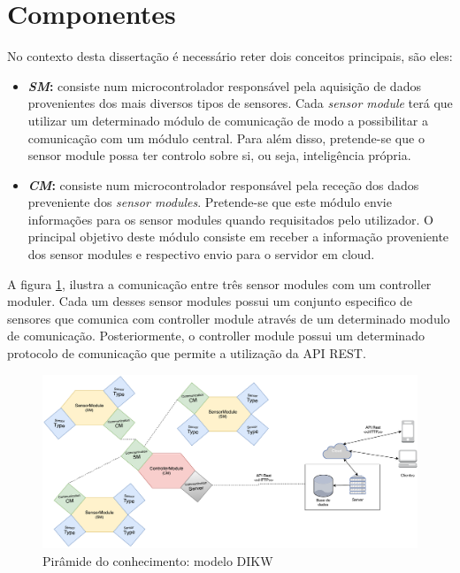 \newpage
\section{Componentes}

No contexto desta dissertação é necessário reter dois conceitos principais, são eles: 

\begin{itemize}
	\item \textbf{\textit{\acl{SM}}:} consiste num microcontrolador responsável pela aquisição de dados provenientes dos mais diversos tipos de sensores. Cada \textit{sensor module} terá que utilizar um determinado módulo de comunicação de modo a possibilitar a comunicação com um módulo central. Para além disso, pretende-se que o sensor module possa ter controlo sobre si, ou seja, inteligência própria.
	 
	\item \textbf{\textit{\acl{CM}}:} consiste num microcontrolador responsável pela receção dos dados preveniente dos \textit{sensor modules}. Pretende-se que este módulo envie informações para os sensor modules quando requisitados pelo utilizador. O principal objetivo deste módulo consiste em receber a informação proveniente dos sensor modules e respectivo envio para o servidor em cloud. 
	
	
\end{itemize}


A figura \ref{esquema1}, ilustra a comunicação entre três sensor modules com um controller moduler. Cada um desses sensor modules possui um conjunto especifico de sensores que comunica com controller module através de um determinado modulo de comunicação. Posteriormente, o controller module possui um determinado protocolo de comunicação que permite a utilização da API REST. 


\begin{figure}[h]
	\centering
	\includegraphics[width=\linewidth]{esquemas/general-electronic-modules.pdf}
	\caption{Pirâmide do conhecimento: modelo DIKW}
	\label{esquema1}
\end{figure}


